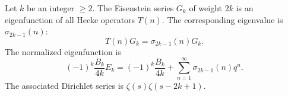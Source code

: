 Let $k$ be an integer $\geq 2$. The Eisenstein series $G_k$ of weight $2k$ is an eigenfunction of all Hecke operators $T(n)$. The corresponding eigenvalue is $\sigma_{2k-1}(n)$:
$$T(n)G_k = \sigma_{2k-1}(n) G_k.$$
The normalized eigenfunction is
$$(-1)^k \frac{B_k}{4k} E_k = (-1)^k \frac{B_k}{4k} + \sum_{n=1}^{\infty} \sigma_{2k-1}(n) q^n.$$
The associated Dirichlet series is $\zeta(s)\zeta(s-2k+1)$.

